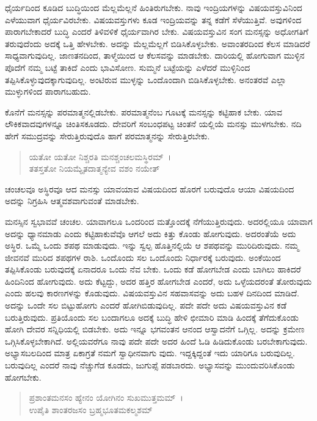 ಧೈರ್ಯದಿಂದ ಕೂಡಿದ ಬುದ್ಧಿಯಿಂದ ಮೆಲ್ಲಮೆಲ್ಲನೆ ಹಿಂತಿರುಗಬೇಕು. ನಾವು ಇಂದ್ರಿಯಗಳನ್ನು ವಿಷಯವಸ್ತುವಿನಿಂದ ಎಳೆಯುವಾಗ ಧೈರ್ಯವಿರಬೇಕು. ವಿಷಯವಸ್ತುಗಳು ಕೂಡ ಇಂದ್ರಿಯವನ್ನು ತನ್ನ ಕಡೆಗೆ ಸೆಳೆಯುತ್ತಿವೆ. ಅವುಗಳಿಂದ ಪಾರಾಗಬೇಕಾದರೆ ಬುದ್ಧಿ ಎಂದರೆ ತಿಳಿವಳಿಕೆ ಧೈರ್ಯವಾಗಿರ ಬೇಕು. ವಿಷಯವಸ್ತುವಿನ ಸಂಗ ಮನಸ್ಸನ್ನು ಅಧೋಗತಿಗೆ ತರುವುದೆಂದು ಅದಕ್ಕೆ ಒತ್ತಿ ಹೇಳಬೇಕು. ಅದನ್ನು ಮೆಲ್ಲಮೆಲ್ಲಗೆ ಬಿಡಿಸಿಕೊಳ್ಳಬೇಕು. ಅವಾಂತರದಿಂದ ಕೆಲಸ ಮಾಡಿದರೆ ಸಾಧ್ಯವಾಗುವುದಿಲ್ಲ. ಜಾಣತನದಿಂದ, ತಾಳ್ಮೆಯಿಂದ ಆ ಕೆಲಸವನ್ನು ಮಾಡಬೇಕು. ದಾರಿಯಲ್ಲಿ ಹೋಗುವಾಗ ಮುಳ್ಳಿನ ಪೊದೆಗೆ ನಮ್ಮ ಬಟ್ಟೆ ತಾಕಿದೆ ಎಂದು ಭಾವಿಸೋಣ. ಸುಮ್ಮನೆ ಬಟ್ಟೆಯನ್ನು ಎಳೆದರೆ ಮುಳ್ಳಿನಿಂದ ತಪ್ಪಿಸಿಕೊಳ್ಳುವುದಕ್ಕಾಗುವುದಿಲ್ಲ. ಅಂಟಿರುವ ಮುಳ್ಳನ್ನು ಒಂದೊಂದಾಗಿ ಬಿಡಿಸಿಕೊಳ್ಳಬೇಕು. ಅನಂತರವೆ ಎಲ್ಲಾ ಮುಳ್ಳುಗಳಿಂದ ಪಾರಾಗಬಹುದು.

ಕೊನೆಗೆ ಮನಸ್ಸನ್ನು ಪರಮಾತ್ಮನಲ್ಲಿಡಬೇಕು. ಪರಮಾತ್ಮನೆಂಬ ಗೂಟಕ್ಕೆ ಮನಸ್ಸನ್ನು ಕಟ್ಟಿಹಾಕ ಬೇಕು. ಯಾವ ಲೌಕಿಕವಾದವುಗಳನ್ನೂ ಚಿಂತಿಸಕೂಡದು. ದೇವರಿಗೆ ಸಂಬಂಧಪಟ್ಟ ಚಿಂತನೆ ಯಲ್ಲಿಯೆ ಮನಸ್ಸು ಮುಳಗಬೇಕು. ನದಿ ಹೇಗೆ ಸಮುದ್ರವನ್ನು ಸೇರುತ್ತಿರುವುದೊ ಹಾಗೆ ಪರಮಾತ್ಮನನ್ನು ಸೇರುತ್ತಿರಬೇಕು.

\begin{verse}
ಯತೋ ಯತೋ ನಿಶ್ಚರತಿ ಮನಶ್ಚಂಚಲಮಸ್ಥಿರಮ್~।\\ತತಸ್ತತೋ ನಿಯಮ್ಯೈತದಾತ್ಮನ್ಯೇವ ವಶಂ ನಯೇತ್ 
\end{verse}

{\small ಚಂಚಲವೂ ಅಸ್ಥಿರವೂ ಆದ ಮನಸ್ಸು ಯಾವಯಾವ ವಿಷಯದಿಂದ ಹೊರಗೆ ಬರುವುದೊ ಆಯಾ ವಿಷಯದಿಂದ ಅದನ್ನು ನಿಗ್ರಹಿಸಿ ಆತ್ಮವಶವಾಗುವಂತೆ ಮಾಡಬೇಕು.}

ಮನಸ್ಸಿನ ಸ್ವಭಾವವೆ ಚಂಚಲ. ಯಾವಾಗಲೂ ಒಂದರಿಂದ ಮತ್ತೊಂದಕ್ಕೆ ನೆಗೆಯುತ್ತಿರುವುದು. ಅದರಲ್ಲಿಯೂ ಯಾವಾಗ ಅದನ್ನು ಧ್ಯಾನಮಾಡು ಎಂದು ಕಟ್ಟಿಹಾಕುವೆವೊ ಆಗಲೆ ಅದು ಕಿತ್ತು ಕೊಂಡು ಹೋಗುವುದು. ಅದರಂತೆಯೆ ಅದು ಅಸ್ಥಿರ. ಒಮ್ಮೆ ಒಂದು ಶಪಥ ಮಾಡುವುದು. ಇನ್ನು ಸ್ವಲ್ಪ ಹೊತ್ತಿನಲ್ಲಿಯೆ ಆ ಶಪಥವನ್ನು ಮುರಿದಿರುವುದು. ನಮ್ಮ ಜೀವನವೆ ಮುರಿದ ಶಪಥಗಳ ರಾಶಿ. ಒಂದೊಂದು ಸಲ ಒಂದೊಂದು ನಿರ್ಧಾರಕ್ಕೆ ಬರುವುದು. ಅಂಕೆಯಿಂದ ತಪ್ಪಿಸಿಕೊಂಡು ಬರುವುದಕ್ಕೆ ಏನಾದರೂ ಒಂದು ನೆವ ಬೇಕು. ಒಂದು ಕಡೆ ಹೋಗಬೇಡ ಎಂದು ಬಾಗಿಲು ಹಾಕಿದರೆ ಹಿಂದಿನಿಂದ ಹೋಗುವುದು. ಅದು ಕೆಟ್ಟದ್ದು, ಅದರ ಹತ್ತಿರ ಹೋಗಬೇಡ ಎಂದರೆ, ಅದು ಒಳ್ಳೆಯದರಂತೆ ತೋರುವುದು ಎಂದು ಹಲವು ಕಾರಣಗಳನ್ನು ಕೊಡುವುದು. ವಿಷಯವಸ್ತುವಿನ ಸಹವಾಸವನ್ನು ಅದು ಬಹಳ ದಿನದಿಂದ ಮಾಡಿದೆ. ಅದನ್ನು ಒಂದೇ ಸಲ ಬಿಟ್ಟುಹೋಗು ಎಂದರೆ ಹೋಗಿಬಿಡುವುದಿಲ್ಲ. ಪದೇ ಪದೇ ಅದು ವಿಷಯವಸ್ತುವಿನ ಕಡೆ ಬರುತ್ತಿರುವುದು. ಪ್ರತಿಯೊಂದು ಸಲ ಬಂದಾಗಲೂ ಅದಕ್ಕೆ ಬುದ್ಧಿ ಹೇಳಿ ಛೀಮಾರಿ ಮಾಡಿ ಹಿಂದಕ್ಕೆ ತೆಗೆದುಕೊಂಡು ಹೋಗಿ ದೇವರ ಸನ್ನಿಧಿಯಲ್ಲಿ ಬಿಡಬೇಕು. ಅದು ಇನ್ನೂ ಭಗವಂತನ ಆನಂದ ಆಸ್ವಾದನೆಗೆ ಒಗ್ಗಿಲ್ಲ. ಅದನ್ನು ಕ್ರಮೇಣ ಒಗ್ಗಿಸಿಕೊಳ್ಳಬೇಕಾಗಿದೆ. ಅಲ್ಲಿಯವರೆಗೂ ನಾವು ಪದೇ ಪದೇ ಅದರ ಹಿಂದೆ ಓಡಿ ಹಿಡಿದುಕೊಂಡು ಬರಬೇಕಾಗುವುದು. ಅಭ್ಯಾಸಬಲದಿಂದ ಮಾತ್ರ ಏಕಾಗ್ರತೆ ನಮಗೆ ಸ್ವಾಧೀನವಾಗು ವುದು. ಇದ್ದಕ್ಕಿದ್ದಂತೆ ಇದು ಯಾರಿಗೂ ಬರುವುದಿಲ್ಲ. ಬರುವುದಿಲ್ಲ ಎಂದರೆ ನಾವು ನೆಚ್ಚುಗೆಡ ಕೂಡದು, ಜುಗುಪ್ಸೆ ಪಡಬಾರದು. ಅಭ್ಯಾಸವನ್ನು ಮುಂದುವರಿಸಿಕೊಂಡು ಹೋಗಬೇಕು.

\begin{verse}
ಪ್ರಶಾಂತಮನಸಂ ಹ್ಯೇನಂ ಯೋಗಿನಂ ಸುಖಮುತ್ತಮಮ್~।\\ಉಪೈತಿ ಶಾಂತರಜಸಂ ಬ್ರಹ್ಮಭೂತಮಕಲ್ಮಶಮ್ 
\end{verse}

